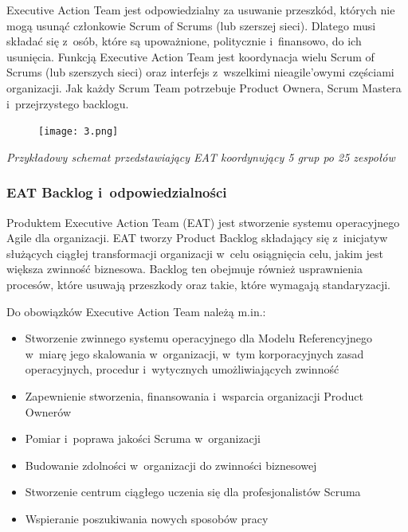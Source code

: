\documentclass[12pt,a4paper,parskip=full]{scrartcl}
\begin{document}
Executive Action Team jest odpowiedzialny za usuwanie przeszkód, których nie mogą usunąć członkowie Scrum of Scrums (lub szerszej sieci). Dlatego musi składać się z~osób, które są upoważnione, politycznie i~finansowo, do ich usunięcia. Funkcją Executive Action Team jest koordynacja wielu Scrum of Scrums (lub szerszych sieci) oraz interfejs z~wszelkimi nieagile'owymi częściami organizacji. Jak każdy Scrum Team potrzebuje Product Ownera, Scrum Mastera i~przejrzystego backlogu.

\begin{figure}[H]
    \centering
    \texttt{[image: 3.png]}
    
\end{figure}


\emph{Przykładowy schemat przedstawiający EAT koordynujący 5 grup po 25 zespołów}

\subsubsection{EAT Backlog i~odpowiedzialności}\label{EAT-backlog-and-responsibilities}

Produktem Executive Action Team (EAT) jest stworzenie systemu operacyjnego Agile dla organizacji. EAT tworzy Product Backlog składający się z~inicjatyw służących ciągłej transformacji organizacji w~celu osiągnięcia celu, jakim jest większa zwinność biznesowa. Backlog ten obejmuje również usprawnienia procesów, które usuwają przeszkody oraz takie, które wymagają standaryzacji.

Do obowiązków Executive Action Team należą m.in.:

\begin{itemize}
\itemsep1pt\parskip0pt
\item
  Stworzenie zwinnego systemu operacyjnego dla Modelu Referencyjnego w~mia\-rę jego skalowania w~organizacji, w~tym korporacyjnych zasad operacyjnych, procedur i~wytycznych umożliwiających zwinność
\item
 Zapewnienie stworzenia, finansowania i~wsparcia organizacji Product Ownerów
\item
  Pomiar i~poprawa jakości Scruma w~organizacji
\item
  Budowanie zdolności w~organizacji do zwinności biznesowej
\item
  Stworzenie centrum ciągłego uczenia się dla profesjonalistów Scruma
\item
  Wspieranie poszukiwania nowych sposobów pracy
\end{itemize}
\end{document}
